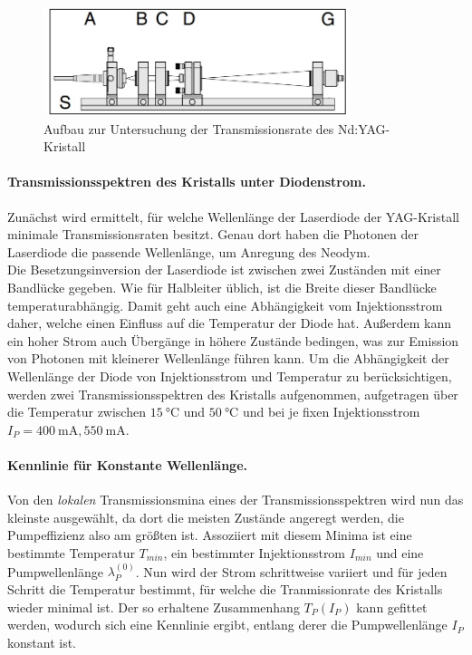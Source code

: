 \documentclass[../main.tex]{subfiles}
\begin{document}
        \begin{figure}[H]
            \centering
            \includegraphics[width=0.8\textwidth]{Bilddateien/Versuchsaufbau/Teil1.jpg}
            \caption{Aufbau zur Untersuchung der Transmissionsrate des Nd:YAG-Kristall \cite[p.28]{doc:experiment08}}
            \label{fig:AufbauTeil1}
        \end{figure}    

        \paragraph{Transmissionsspektren des Kristalls unter Diodenstrom.}\label{sec:Transmissionspektren}
        Zunächst wird ermittelt, für welche Wellenlänge der Laserdiode der YAG-Kristall minimale Transmissionsraten besitzt. Genau dort haben die Photonen der Laserdiode die passende Wellenlänge, um Anregung des Neodym.\\
        
        Die Besetzungsinversion der Laserdiode ist zwischen zwei Zuständen mit einer Bandlücke gegeben. Wie für Halbleiter üblich, ist die Breite dieser Bandlücke temperaturabhängig. Damit geht auch eine Abhängigkeit vom Injektionsstrom daher, welche einen Einfluss auf die Temperatur der Diode hat. Außerdem kann ein hoher Strom auch Übergänge in höhere Zustände bedingen, was zur Emission von Photonen mit kleinerer Wellenlänge führen kann. Um die Abhängigkeit der Wellenlänge der Diode von Injektionsstrom und Temperatur zu berücksichtigen, werden zwei Transmissionsspektren des Kristalls aufgenommen, aufgetragen über die Temperatur zwischen $\SI{15}{\celsius}$ und $\SI{50}{\celsius}$ und bei je fixen Injektionsstrom $I_P=\SI{400}{\m\A}, \SI{550}{\m\A}$.

        \paragraph{Kennlinie für Konstante Wellenlänge.} Von den \textit{lokalen} Transmissionsmina eines der Transmissionsspektren wird nun das kleinste ausgewählt, da dort die meisten Zustände angeregt werden, die Pumpeffizienz also am größten ist. Assoziiert mit diesem Minima ist eine bestimmte Temperatur $T_{min}$, ein bestimmter Injektionsstrom $I_{min}$ und eine Pumpwellenlänge $\lambda_P^{(0)}$. Nun wird der Strom schrittweise variiert und für jeden Schritt die Temperatur bestimmt, für welche die Tranmissionrate des Kristalls wieder minimal ist. Der so erhaltene Zusammenhang $T_P(I_P)$ kann gefittet werden, wodurch sich eine Kennlinie ergibt, entlang derer die Pumpwellenlänge $I_P$ konstant ist.\\
        
\end{document}
